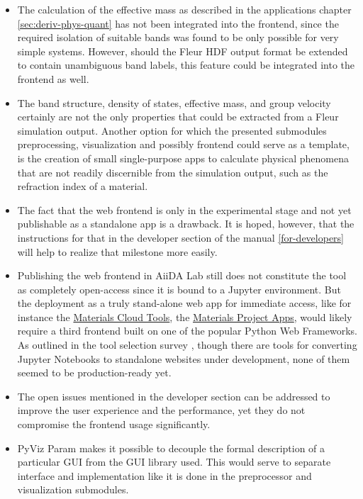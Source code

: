 \begin{itemize}
\begin{itemize}
    \item The calculation of the effective mass as described in the applications
        chapter \vref{sec:deriv-phys-quant} has not been integrated into the
        frontend, since the required isolation of suitable bands was found to be
        only possible for very simple systems. However, should the Fleur HDF
        output format be extended to contain unambiguous band labels, this
        feature could be integrated into the frontend as well.
    \item The band structure, density of states, effective mass, and group
        velocity certainly are not the only properties that could be extracted
        from a Fleur simulation output. Another option for which the presented
        submodules preprocessing, visualization and possibly frontend could
        serve as a template, is the creation of small single-purpose apps to
        calculate physical phenomena that are not readily discernible from the
        simulation output, such as the refraction index of a material.
    \item The fact that the web frontend is only in the experimental stage and
        not yet publishable as a standalone app is a drawback. It is hoped,
        however, that the instructions for that in the developer section of the
        manual \vref{for-developers} will help to realize that milestone more
        easily.
    \item Publishing the web frontend in AiiDA Lab still does not constitute the
        tool as completely open-access since it is bound to a Jupyter
        environment. But the deployment as a truly stand-alone web app for
        immediate access, like for instance the
        \href{https://www.materialscloud.org/work/menu}{Materials Cloud Tools},
        the \href{https://materialsproject.org/}{Materials Project Apps}, would
        likely require a third frontend built on one of the popular Python Web
        Frameworks. As outlined in the tool selection survey \cite{jw-notes},
        though there are tools for converting Jupyter Notebooks to standalone
        websites under development, none of them seemed to be production-ready
        yet.
    \item The open issues mentioned in the developer section can be
        addressed to improve the user experience and the performance, yet they
        do not compromise the frontend usage significantly.
    \item PyViz Param \cite{pyviz-param} makes it possible to decouple the
        formal description of a particular GUI from the GUI library used. This
        would serve to separate interface and implementation like it is done in
        the preprocessor and visualization submodules.
    \end{itemize}
\end{itemize}


